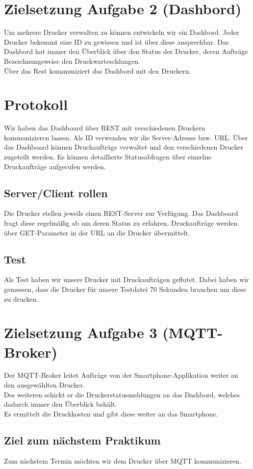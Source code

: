 \documentclass[10pt]{article}
\begin{document}
\section{Zielsetzung Aufgabe 2 (Dashbord)}
Um mehrere Drucker verwalten zu können entwickeln wir ein Dashbord. Jeder Drucker bekommt eine ID zu gewissen und ist über diese ansprechbar.
Das Dashbord hat immer den Überblick über den Status der Drucker, deren Aufträge Bezeichnungsweise den Druckwarteschlangen.
\\
Über das Rest kommuniziert das Dashbord mit den Druckern.


\section{Protokoll}
Wir haben das Dashboard über REST mit verschiedenen Druckern kommunizieren lassen. Als ID verwenden wir die Server-Adresse bzw. URL. Über das Dashboard können Druckaufträge verwaltet und den verschiedenen Drucker zugeteilt werden.
Es können detaillierte Statusabfragen über einzelne Druckaufträge aufgerufen werden.

\subsection{Server/Client rollen}
Die Drucker stellen jeweils einen REST-Server zur Verfügung. Das Dashboard fragt diese regelmäßig ab um deren Status zu erfahren. Druckaufträge werden über GET-Parameter in der URL an die Drucker übermittelt.
\subsection{Test}
Als Test haben wir unsere Drucker mit Druckaufträgen geflutet. Dabei haben wir gemessen, dass die Drucker für unsere Testdatei 70 Sekunden brauchen um diese zu drucken.

\section{Zielsetzung Aufgabe 3 (MQTT-Broker)}
Der MQTT-Broker leitet Aufträge von der Smartphone-Applikation weiter an den ausgewählten Drucker. \\
Des weiteren schickt er die Druckerstatusmeldungen an das Dashbord, welches dadurch immer den Überblick behält.\\
Es ermittelt die Druckkosten und gibt diese weiter an das Smartphone.\\


\subsection{Ziel zum nächstem Praktikum}
Zum nächstem Termin möchten wir dem Drucker über MQTT kommunizieren.
\end{document}
